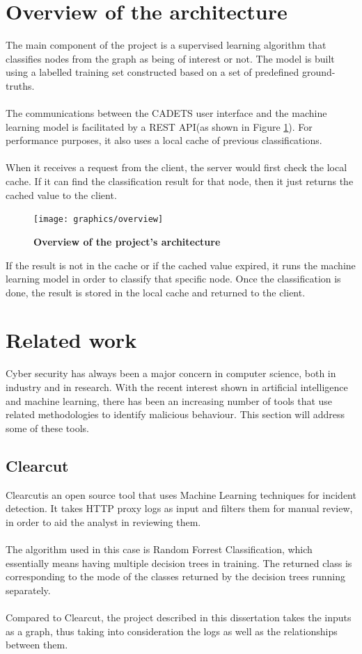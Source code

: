 	\section{Overview of the architecture}\label{1.2}
	The main component of the project is a supervised learning algorithm that classifies nodes from the graph as being of interest or not. The model is built using a labelled training set constructed based on a set of predefined ground-truths.
	\\ \\
	The communications between the CADETS user interface and the machine learning model is facilitated by a REST API(as shown in Figure \ref{Figure 1.2}). For performance purposes, it also uses a local cache of previous classifications. 
	\\ \\ 
	When it receives a request from the client, the server would first check the local cache. If it can find the classification result for that node, then it just returns the cached value to the client.
	\begin{figure}[H]
		\centering
		\texttt{[image: graphics/overview]}
		\label{Figure 1.2}
		\caption{\bf Overview of the project's architecture}
	\end{figure}
	
	If the result is not in the cache or if the cached value expired, it runs the machine learning model in order to classify that specific node. Once the classification is done, the result is stored in the local cache and returned to the client. 
	
	\section{Related work}
	Cyber security has always been a major concern in computer science, both in industry and in research. With the recent interest shown in artificial intelligence and machine learning, there has been an increasing number of tools that use related methodologies to identify malicious behaviour. This section will address some of these tools. 
	
	\subsection{Clearcut}
	Clearcut\footnotemark[1] is an open source tool that uses Machine Learning techniques for incident detection. It takes HTTP proxy logs as input and filters them for manual review, in order to aid the analyst in reviewing them. 
	\\ \\ 
	The algorithm used in this case is Random Forrest Classification, which essentially means having multiple decision trees in training. The returned class is corresponding to the mode of the classes returned by the decision trees running separately. 
	\\ \\
	Compared to Clearcut, the project described in this dissertation takes the inputs as a graph, thus taking into consideration the logs as well as the relationships between them. 
	
